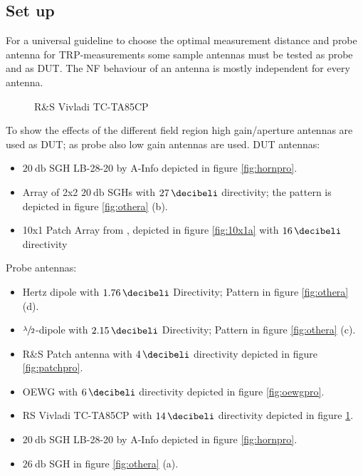 \subsection{Set up}

For a universal guideline to choose the optimal measurement distance and probe antenna for \ac{TRP}-measurements some sample antennas must be tested as probe and as \ac{DUT}. The \ac{NF} behaviour of an antenna is mostly independent for every antenna.

\begin{figure}
  \centering
  \centering
\caption{R\&{}S Vivladi TC-TA85CP}
\label{fig:vivpro}
\end{figure}

To show the effects of the different field region high gain/aperture antennas are used as \ac{DUT}; as probe also low gain antennas are used. \ac{DUT} antennas:

\begin{itemize}
\item $\SI{20}{\decibel}$ \ac{SGH} LB-28-20 by A-Info depicted in figure \ref{fig:hornpro}.
\item Array of 2x2 $\SI{20}{\decibel}$ \acp{SGH} with $\SI{27}{\decibeli}$ directivity; the pattern is depicted in figure \ref{fig:othera} (b).
\item 10x1 Patch Array from \cite{7481205}, depicted in figure \ref{fig:10x1a} with $\SI{16}{\decibeli}$ directivity
\end{itemize}

Probe antennas:

\begin{itemize}
\item Hertz dipole with $\SI{1.76}{\decibeli}$ Directivity; Pattern in figure \ref{fig:othera} (d).
\item $\sfrac{\lambda}{2}$-dipole with $\SI{2.15}{\decibeli}$ Directivity; Pattern in figure \ref{fig:othera} (c).
\item R\&{}S Patch antenna with $\SI{4}{\decibeli}$ directivity depicted in figure \ref{fig:patchpro}.
\item \ac{OEWG} with $\SI{6}{\decibeli}$ directivity depicted in figure \ref{fig:oewgpro}.
\item \ac{RS} Vivladi TC-TA85CP with $\SI{14}{\decibeli}$ directivity depicted in figure \ref{fig:vivpro}.
\item $\SI{20}{\decibel}$ \ac{SGH} LB-28-20 by A-Info depicted in figure \ref{fig:hornpro}.
\item $\SI{26}{\decibel}$ \ac{SGH} in figure \ref{fig:othera} (a).
\end{itemize}

